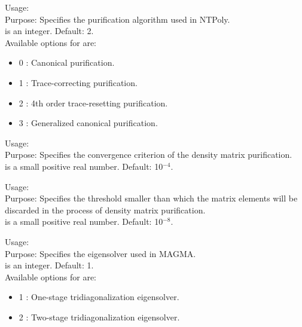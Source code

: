 {
  \noindent
  Usage:   \\[1.0ex]
  Purpose: Specifies the purification algorithm used in NTPoly. \\[1.0ex]
   is an integer. Default: 2. \\
}
Available options for  are:
\begin{itemize}
  \item 0 : Canonical purification.
  \item 1 : Trace-correcting purification.
  \item 2 : 4th order trace-resetting purification.
  \item 3 : Generalized canonical purification.
\end{itemize}

{
  \noindent
  Usage:   \\[1.0ex]
  Purpose: Specifies the convergence criterion of the density matrix
    purification. \\[1.0ex]
   is a small positive real number. Default: 10$^{-4}$. \\
}

{
  \noindent
  Usage:   \\[1.0ex]
  Purpose: Specifies the threshold smaller than which the matrix elements will
    be discarded in the process of density matrix purification. \\[1.0ex]
   is a small positive real number. Default: 10$^{-8}$. \\
}

{
  \noindent
  Usage:   \\[1.0ex]
  Purpose: Specifies the eigensolver used in MAGMA. \\[1.0ex]
   is an integer. Default: 1. \\
}
Available options for  are:
\begin{itemize}
  \item 1 : One-stage tridiagonalization eigensolver.
  \item 2 : Two-stage tridiagonalization eigensolver.
\end{itemize}

